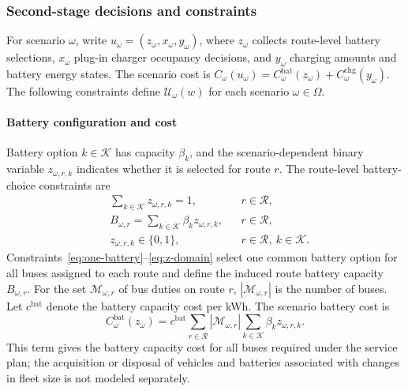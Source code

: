 \subsubsection{Second-stage decisions and constraints}
\label{subsubsec:second-stage}

For scenario $\omega$, write $u_\omega=(z_\omega,x_\omega,y_\omega)$, where $z_\omega$ collects route-level battery selections, $x_\omega$ plug-in charger occupancy decisions, and $y_\omega$ charging amounts and battery energy states.
The scenario cost is $C_\omega(u_\omega)=C^{\mathrm{bat}}_\omega(z_\omega)+C^{\mathrm{chg}}_\omega(y_\omega)$.
The following constraints define $\mathcal U_\omega(w)$ for each scenario $\omega\in\Omega$.

\paragraph{Battery configuration and cost}
Battery option $k\in\mathcal K$ has capacity $\beta_k$, and the scenario-dependent binary variable $z_{\omega,r,k}$ indicates whether it is selected for route $r$.
The route-level battery-choice constraints are
\begin{align}
    & \sum_{k \in \mathcal{K}} z_{\omega,r,k} = 1,
    && r \in \mathcal{R},
    \label{eq:one-battery} \\
    & B_{\omega,r}
    =
    \sum_{k \in \mathcal{K}} \beta_k z_{\omega,r,k},
    && r \in \mathcal{R},
    \label{eq:battery-size} \\
    & z_{\omega,r,k} \in \{0,1\},
    && r \in \mathcal{R},\ k \in \mathcal{K}.
    \label{eq:z-domain}
\end{align}
Constraints~\eqref{eq:one-battery}--\eqref{eq:z-domain} select one common battery option for all buses assigned to each route and define the induced route battery capacity $B_{\omega,r}$.
For the set $\mathcal M_{\omega,r}$ of bus duties on route $r$, $|\mathcal M_{\omega,r}|$ is the number of buses.
Let $c^{\mathrm{bat}}$ denote the battery capacity cost per kWh.
The scenario battery cost is
\[
    C^{\mathrm{bat}}_\omega(z_\omega)
    =
    c^{\mathrm{bat}}
    \sum_{r \in \mathcal{R}}
    |\mathcal M_{\omega,r}|
    \sum_{k \in \mathcal{K}}
    \beta_k z_{\omega,r,k}.
\]
This term gives the battery capacity cost for all buses required under the service plan; the acquisition or disposal of vehicles and batteries associated with changes in fleet size is not modeled separately.

